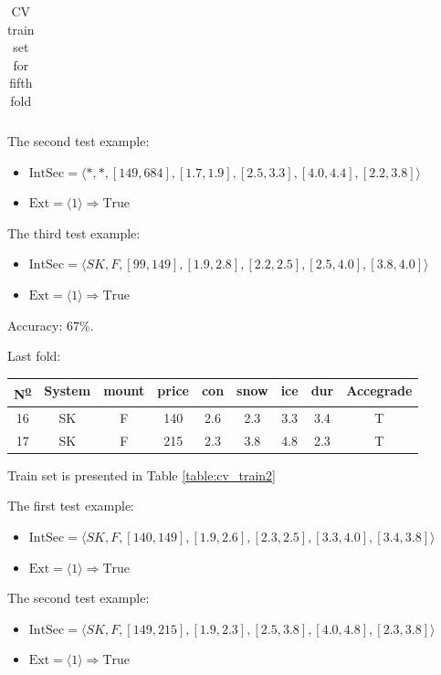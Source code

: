\documentclass[12pt]{report}
\begin{document}
\begin{solution}
\begin{enumerate}
\begin{table}[H]
\begin{tabular}{|c|c|c|c|c|c|c|c|c|}
      \end{tabular}
      \caption{CV train set for fifth fold}
      \label{table:cv_train}
      \end{table}
    The second test example:
    \begin{itemize}
      \item $\text{IntSec} = \langle *, *, [ 149, 684], [1.7, 1.9], [2.5, 3.3], [4.0, 4.4], [2.2, 3.8] \rangle$
      \item $\text{Ext} = \langle 1 \rangle \Longrightarrow \text{True}$
    \end{itemize}
    The third test example:
    \begin{itemize}
      \item $\text{IntSec} = \langle SK, F, [ 99, 149], [1.9, 2.8], [2.2, 2.5], [2.5, 4.0], [3.8, 4.0] \rangle$
      \item $\text{Ext} = \langle 1 \rangle \Longrightarrow \text{True}$
    \end{itemize}
    Accuracy: $67\%$.
    \par 
    Last fold:
    \begin{table}[H]
      \centering
      \begin{tabular}{|c|c|c|c|c|c|c|c|c|}
      \hline
      N\textsuperscript{\underline{o}} & System & mount & price & con & snow & ice & dur & Accegrade \\ \hline
      16 & SK     & F     & 140   & 2.6 & 2.3  & 3.3 & 3.4 & T         \\ \hline
      17 & SK     & F     & 215   & 2.3 & 3.8  & 4.8 & 2.3 & T         \\ \hline
      \end{tabular}
      \end{table}
      Train set is presented in Table \ref{table:cv_train2}
      \par
      The first test example:
      \begin{itemize}
        \item $\text{IntSec} = \langle SK, F, [ 140, 149], [1.9, 2.6], [2.3, 2.5], [3.3, 4.0], [3.4, 3.8] \rangle$
        \item $\text{Ext} = \langle 1 \rangle \Longrightarrow \text{True}$
      \end{itemize}
      The second test example:
      \begin{itemize}
        \item $\text{IntSec} = \langle SK, F, [ 149, 215], [1.9, 2.3], [2.5, 3.8], [4.0, 4.8], [2.3, 3.8] \rangle$
        \item $\text{Ext} = \langle 1 \rangle \Longrightarrow \text{True}$

\end{itemize}
\end{enumerate}
\end{solution}
\end{document}
